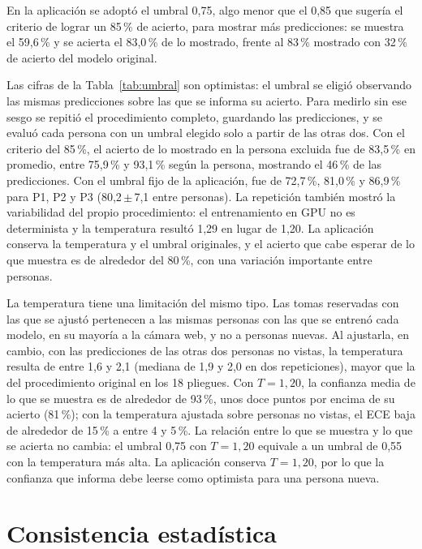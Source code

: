 En la aplicación se adoptó el umbral 0,75, algo menor que el 0,85 que sugería el criterio de lograr un 85\,\% de acierto, para mostrar más predicciones: se muestra el 59,6\,\% y se acierta el 83,0\,\% de lo mostrado, frente al 83\,\% mostrado con 32\,\% de acierto del modelo original.

Las cifras de la Tabla~\ref{tab:umbral} son optimistas: el umbral se eligió observando las mismas predicciones sobre las que se informa su acierto. Para medirlo sin ese sesgo se repitió el procedimiento completo, guardando las predicciones, y se evaluó cada persona con un umbral elegido solo a partir de las otras dos. Con el criterio del 85\,\%, el acierto de lo mostrado en la persona excluida fue de 83,5\,\% en promedio, entre 75,9\,\% y 93,1\,\% según la persona, mostrando el 46\,\% de las predicciones. Con el umbral fijo de la aplicación, fue de 72,7\,\%, 81,0\,\% y 86,9\,\% para P1, P2 y P3 (80,2\,$\pm$\,7,1 entre personas). La repetición también mostró la variabilidad del propio procedimiento: el entrenamiento en GPU no es determinista y la temperatura resultó 1,29 en lugar de 1,20. La aplicación conserva la temperatura y el umbral originales, y el acierto que cabe esperar de lo que muestra es de alrededor del 80\,\%, con una variación importante entre personas.

La temperatura tiene una limitación del mismo tipo. Las tomas reservadas con las que se ajustó pertenecen a las mismas personas con las que se entrenó cada modelo, en su mayoría a la cámara web, y no a personas nuevas. Al ajustarla, en cambio, con las predicciones de las otras dos personas no vistas, la temperatura resulta de entre 1,6 y 2,1 (mediana de 1,9 y 2,0 en dos repeticiones), mayor que la del procedimiento original en los 18 pliegues. Con $T = 1{,}20$, la confianza media de lo que se muestra es de alrededor de 93\,\%, unos doce puntos por encima de su acierto (81\,\%); con la temperatura ajustada sobre personas no vistas, el ECE baja de alrededor de 15\,\% a entre 4 y 5\,\%. La relación entre lo que se muestra y lo que se acierta no cambia: el umbral 0,75 con $T = 1{,}20$ equivale a un umbral de 0,55 con la temperatura más alta. La aplicación conserva $T = 1{,}20$, por lo que la confianza que informa debe leerse como optimista para una persona nueva.

\section{Consistencia estadística}
\label{sec:res-consistencia}

